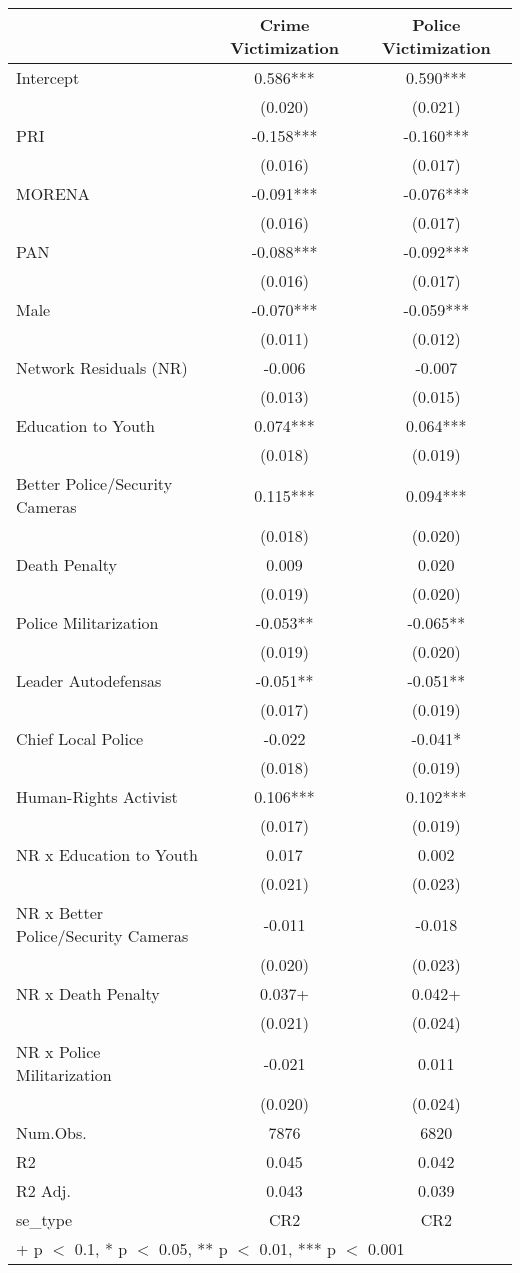 \begin{table}[H]
\centering
\begin{tabular}[t]{lcc}
\toprule
  & Crime Victimization & Police Victimization\\
\midrule
Intercept & 0.586*** & 0.590***\\
 & (0.020) & (0.021)\\
PRI & -0.158*** & -0.160***\\
 & (0.016) & \vphantom{2}(0.017)\\
MORENA & -0.091*** & -0.076***\\
 & (0.016) & \vphantom{1}(0.017)\\
PAN & -0.088*** & -0.092***\\
 & (0.016) & (0.017)\\
Male & -0.070*** & -0.059***\\
 & (0.011) & (0.012)\\
Network Residuals (NR) & -0.006 & -0.007\\
 & (0.013) & (0.015)\\
Education to Youth & 0.074*** & 0.064***\\
 & (0.018) & \vphantom{1}(0.019)\\
Better Police/Security Cameras & 0.115*** & 0.094***\\
 & (0.018) & (0.020)\\
Death Penalty & 0.009 & 0.020\\
 & (0.019) & \vphantom{1}(0.020)\\
Police Militarization & -0.053** & -0.065**\\
 & (0.019) & (0.020)\\
Leader Autodefensas & -0.051** & -0.051**\\
 & (0.017) & \vphantom{1}(0.019)\\
Chief Local Police & -0.022 & -0.041*\\
 & (0.018) & (0.019)\\
Human-Rights Activist & 0.106*** & 0.102***\\
 & (0.017) & (0.019)\\
NR x Education to Youth & 0.017 & 0.002\\
 & (0.021) & (0.023)\\
NR x Better Police/Security Cameras & -0.011 & -0.018\\
 & (0.020) & (0.023)\\
NR x Death Penalty & 0.037+ & 0.042+\\
 & (0.021) & (0.024)\\
NR x Police Militarization & -0.021 & 0.011\\
 & (0.020) & (0.024)\\
\midrule
Num.Obs. & 7876 & 6820\\
R2 & 0.045 & 0.042\\
R2 Adj. & 0.043 & 0.039\\
se\_type & CR2 & CR2\\
\bottomrule
\multicolumn{3}{l}{\textsuperscript{} + p $<$ 0.1, * p $<$ 0.05, ** p $<$ 0.01, *** p $<$ 0.001}\\
\end{tabular}
\end{table}
